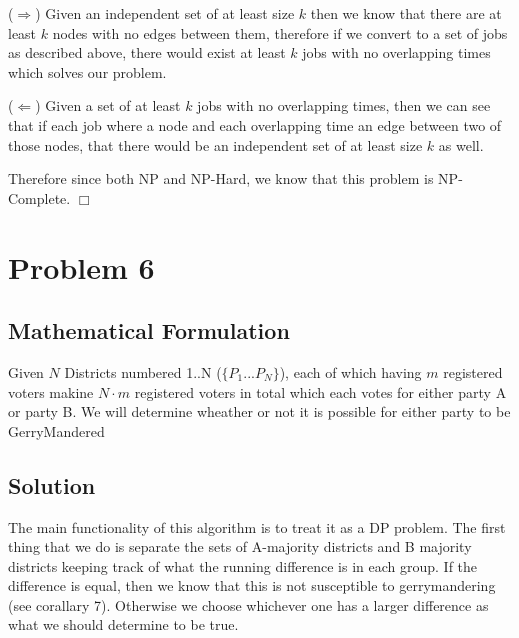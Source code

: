 \documentclass[12pt]{article}
\begin{document}
($\Rightarrow$) Given an independent set of at least size $k$ then we know that there are at least $k$ nodes with no
edges between them, therefore if we convert to a set of jobs as described above, there would exist at least $k$
jobs with no overlapping times which solves our problem.

($\Leftarrow$) Given a set of at least $k$ jobs with no overlapping times, then we can see that if each job where
a node and each overlapping time an edge between two of those nodes, that there would be an independent set of
at least size $k$ as well.

Therefore since both NP and NP-Hard, we know that this problem is NP-Complete. $\Box$

\newpage




\section{Problem 6}
\subsection{Mathematical Formulation}
Given $N$ Districts numbered 1..N ($\{P_1 ... P_N\}$), each of which having $m$ registered voters makine
$N\cdot m$ registered voters in total which each votes for either party A or party B. We will determine wheather
or not it is possible for either party to be GerryMandered


\subsection{Solution}
The main functionality of this algorithm is to treat it as a DP problem. The first thing that we do is separate
the sets of A-majority districts and B majority districts keeping track of what the running difference is in
each group. If the difference is equal, then we know that this is not susceptible to gerrymandering (see corallary 7).
Otherwise we choose whichever one has a larger difference as what we should determine to be true.
\end{document}
